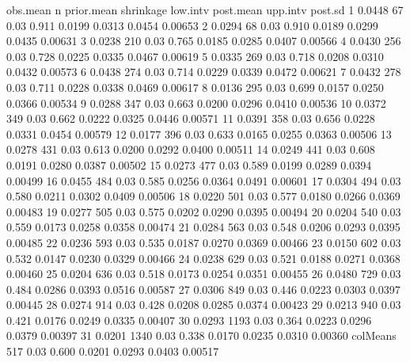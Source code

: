 \documentclass[article]{jss}
\begin{document}
\begin{CodeChunk}
\begin{CodeOutput}
         obs.mean    n prior.mean shrinkage low.intv post.mean upp.intv post.sd
1          0.0448   67       0.03     0.911   0.0199    0.0313   0.0454 0.00653
2          0.0294   68       0.03     0.910   0.0189    0.0299   0.0435 0.00631
3          0.0238  210       0.03     0.765   0.0185    0.0285   0.0407 0.00566
4          0.0430  256       0.03     0.728   0.0225    0.0335   0.0467 0.00619
5          0.0335  269       0.03     0.718   0.0208    0.0310   0.0432 0.00573
6          0.0438  274       0.03     0.714   0.0229    0.0339   0.0472 0.00621
7          0.0432  278       0.03     0.711   0.0228    0.0338   0.0469 0.00617
8          0.0136  295       0.03     0.699   0.0157    0.0250   0.0366 0.00534
9          0.0288  347       0.03     0.663   0.0200    0.0296   0.0410 0.00536
10         0.0372  349       0.03     0.662   0.0222    0.0325   0.0446 0.00571
11         0.0391  358       0.03     0.656   0.0228    0.0331   0.0454 0.00579
12         0.0177  396       0.03     0.633   0.0165    0.0255   0.0363 0.00506
13         0.0278  431       0.03     0.613   0.0200    0.0292   0.0400 0.00511
14         0.0249  441       0.03     0.608   0.0191    0.0280   0.0387 0.00502
15         0.0273  477       0.03     0.589   0.0199    0.0289   0.0394 0.00499
16         0.0455  484       0.03     0.585   0.0256    0.0364   0.0491 0.00601
17         0.0304  494       0.03     0.580   0.0211    0.0302   0.0409 0.00506
18         0.0220  501       0.03     0.577   0.0180    0.0266   0.0369 0.00483
19         0.0277  505       0.03     0.575   0.0202    0.0290   0.0395 0.00494
20         0.0204  540       0.03     0.559   0.0173    0.0258   0.0358 0.00474
21         0.0284  563       0.03     0.548   0.0206    0.0293   0.0395 0.00485
22         0.0236  593       0.03     0.535   0.0187    0.0270   0.0369 0.00466
23         0.0150  602       0.03     0.532   0.0147    0.0230   0.0329 0.00466
24         0.0238  629       0.03     0.521   0.0188    0.0271   0.0368 0.00460
25         0.0204  636       0.03     0.518   0.0173    0.0254   0.0351 0.00455
26         0.0480  729       0.03     0.484   0.0286    0.0393   0.0516 0.00587
27         0.0306  849       0.03     0.446   0.0223    0.0303   0.0397 0.00445
28         0.0274  914       0.03     0.428   0.0208    0.0285   0.0374 0.00423
29         0.0213  940       0.03     0.421   0.0176    0.0249   0.0335 0.00407
30         0.0293 1193       0.03     0.364   0.0223    0.0296   0.0379 0.00397
31         0.0201 1340       0.03     0.338   0.0170    0.0235   0.0310 0.00360
colMeans           517       0.03     0.600   0.0201    0.0293   0.0403 0.00517
\end{CodeOutput}
\end{CodeChunk}
\end{document}
